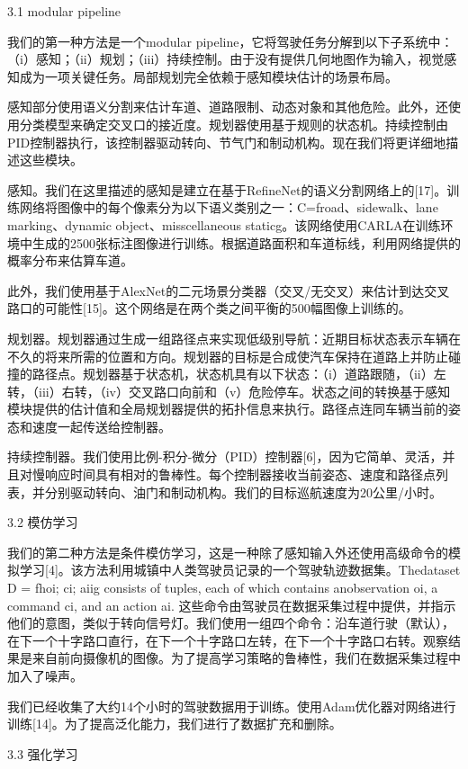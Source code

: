3.1 modular pipeline

我们的第一种方法是一个modular pipeline，它将驾驶任务分解到以下子系统中：（i）感知；（ii）规划；（iii）持续控制。由于没有提供几何地图作为输入，视觉感知成为一项关键任务。局部规划完全依赖于感知模块估计的场景布局。

感知部分使用语义分割来估计车道、道路限制、动态对象和其他危险。此外，还使用分类模型来确定交叉口的接近度。规划器使用基于规则的状态机。持续控制由PID控制器执行，该控制器驱动转向、节气门和制动机构。现在我们将更详细地描述这些模块。

感知。我们在这里描述的感知是建立在基于RefineNet的语义分割网络上的[17]。训练网络将图像中的每个像素分为以下语义类别之一：C=froad、sidewalk、lane marking、dynamic object、misscellaneous staticg。该网络使用CARLA在训练环境中生成的2500张标注图像进行训练。根据道路面积和车道标线，利用网络提供的概率分布来估算车道。

此外，我们使用基于AlexNet的二元场景分类器（交叉/无交叉）来估计到达交叉路口的可能性[15]。这个网络是在两个类之间平衡的500幅图像上训练的。

规划器。规划器通过生成一组路径点来实现低级别导航：近期目标状态表示车辆在不久的将来所需的位置和方向。规划器的目标是合成使汽车保持在道路上并防止碰撞的路径点。规划器基于状态机，状态机具有以下状态：（i）道路跟随，（ii）左转，（iii）右转，（iv）交叉路口向前和（v）危险停车。状态之间的转换基于感知模块提供的估计值和全局规划器提供的拓扑信息来执行。路径点连同车辆当前的姿态和速度一起传送给控制器。

持续控制器。我们使用比例-积分-微分（PID）控制器[6]，因为它简单、灵活，并且对慢响应时间具有相对的鲁棒性。每个控制器接收当前姿态、速度和路径点列表，并分别驱动转向、油门和制动机构。我们的目标巡航速度为20公里/小时。

3.2 模仿学习

我们的第二种方法是条件模仿学习，这是一种除了感知输入外还使用高级命令的模拟学习[4]。该方法利用城镇中人类驾驶员记录的一个驾驶轨迹数据集。Thedataset D = fhoi; ci; aiig consists of tuples, each of which contains anobservation oi, a command ci, and an action ai. 这些命令由驾驶员在数据采集过程中提供，并指示他们的意图，类似于转向信号灯。我们使用一组四个命令：沿车道行驶（默认），在下一个十字路口直行，在下一个十字路口左转，在下一个十字路口右转。观察结果是来自前向摄像机的图像。为了提高学习策略的鲁棒性，我们在数据采集过程中加入了噪声。

我们已经收集了大约14个小时的驾驶数据用于训练。使用Adam优化器对网络进行训练[14]。为了提高泛化能力，我们进行了数据扩充和删除。

3.3 强化学习

